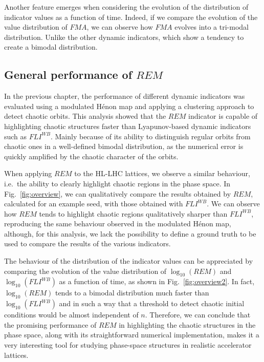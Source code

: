 Another feature emerges when considering the evolution of the distribution of indicator values as a function of time. Indeed, if we compare the evolution of the value distribution of $FMA$, we can observe how $FMA$ evolves into a tri-modal distribution. Unlike the other dynamic indicators, which show a tendency to create a bimodal distribution.

\subsection{General performance of $REM$}

In the previous chapter, the performance of different dynamic indicators was evaluated using a modulated Hénon map and applying a clustering approach to detect chaotic orbits. This analysis showed that the $REM$ indicator is capable of highlighting chaotic structures faster than Lyapunov-based dynamic indicators such as $FLI^{WB}$. Mainly because of its ability to distinguish regular orbits from chaotic ones in a well-defined bimodal distribution, as the numerical error is quickly amplified by the chaotic character of the orbits.

When applying $REM$ to the HL-LHC lattices, we observe a similar behaviour, i.e.\ the ability to clearly highlight chaotic regions in the phase space. In Fig.~\ref{fig:overview}, we can qualitatively compare the results obtained by $REM$, calculated for an example seed, with those obtained with $FLI^{WB}$. We can observe how $REM$ tends to highlight chaotic regions qualitatively sharper than $FLI^{WB}$, reproducing the same behaviour observed in the modulated Hénon map, although, for this analysis, we lack the possibility to define a ground truth to be used to compare the results of the various indicators.

The behaviour of the distribution of the indicator values can be appreciated by comparing the evolution of the value distribution of $\log_{10}(REM)$ and $\log_{10}(FLI^{WB})$ as a function of time, as shown in Fig.~\ref{fig:overview2}. In fact, $\log_{10}(REM)$ tends to a bimodal distribution much faster than $\log_{10}(FLI^{WB})$ and in such a way that a threshold to detect chaotic initial conditions would be almost independent of $n$. Therefore, we can conclude that the promising performance of $REM$ in highlighting the chaotic structures in the phase space, along with its straightforward numerical implementation, makes it a very interesting tool for studying phase-space structures in realistic accelerator lattices.

